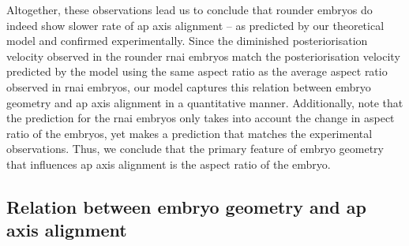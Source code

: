 Altogether, these observations lead us to conclude that rounder embryos do indeed show slower rate of \ac{ap} axis alignment -- as predicted by our theoretical model and confirmed experimentally. Since the diminished posteriorisation velocity observed in the rounder  \ac{rnai} embryos match the posteriorisation velocity predicted by the model using the same aspect ratio as the average aspect ratio observed in  \ac{rnai} embryos, our model captures this relation between embryo geometry and \ac{ap} axis alignment in a quantitative manner. Additionally, note that the prediction for the  \ac{rnai} embryos only takes into account the change in aspect ratio of the embryos, yet makes a prediction that matches the experimental observations. Thus, we conclude that the primary feature of embryo geometry that influences \ac{ap} axis alignment is the aspect ratio of the embryo.


\subsection{Relation between embryo geometry and \acs{ap} axis alignment}\label{subsec:postVelVsAspectRatio}

